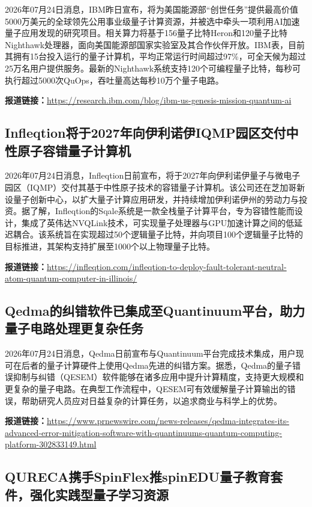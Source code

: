 \documentclass[12pt,a4paper]{ctexart}
\begin{document}
2026年07月24日消息，IBM昨日宣布，将为美国能源部“创世任务”提供最高价值5000万美元的全球领先公用事业级量子计算资源，并被选中牵头一项利用AI加速量子应用发现的研究项目。相关算力将基于156量子比特Heron和120量子比特Nighthawk处理器，面向美国能源部国家实验室及其合作伙伴开放。IBM表，目前其拥有15台投入运行的量子计算机，平均正常运行时间超过97\%，可全天候为超过25万名用户提供服务。最新的Nighthawk系统支持120个可编程量子比特，每秒可执行超过5000次QuOps，吞吐量高达每秒10万个量子电路。

\noindent\textbf{报道链接：}\url{https://research.ibm.com/blog/ibm-us-genesis-mission-quantum-ai}

\subsection{ Infleqtion将于2027年向伊利诺伊IQMP园区交付中性原子容错量子计算机 }

2026年07月24日消息，Infleqtion日前宣布，将于2027年向伊利诺伊量子与微电子园区（IQMP）交付其基于中性原子技术的容错量子计算机。该公司还在芝加哥新设量子创新中心，以扩大量子计算应用研发，并持续增加伊利诺伊州的劳动力与投资。据了解，Infleqtion的Sqale系统是一款全栈量子计算平台，专为容错性能而设计，集成了英伟达NVQLink技术，可实现量子处理器与GPU加速计算之间的低延迟耦合。该系统旨在实现超过50个逻辑量子比特，并向项目100个逻辑量子比特的目标推进，其架构支持扩展至1000个以上物理量子比特。

\noindent\textbf{报道链接：}\url{https://infleqtion.com/infleqtion-to-deploy-fault-tolerant-neutral-atom-quantum-computer-in-illinois/}

\subsection{ Qedma的纠错软件已集成至Quantinuum平台，助力量子电路处理更复杂任务 }

2026年07月24日消息，Qedma日前宣布与Quantinuum平台完成技术集成，用户现可在后者的量子计算硬件上使用Qedma先进的纠错方案。据悉，Qedma的量子错误抑制与纠错（QESEM）软件能够在诸多应用中提升计算精度，支持更大规模和更复杂的量子电路。在典型工作流程中，QESEM可有效缓解量子计算输出的错误，帮助研究人员应对日益复杂的计算任务，以追求商业与科学上的优势。

\noindent\textbf{报道链接：}\url{https://www.prnewswire.com/news-releases/qedma-integrates-its-advanced-error-mitigation-software-with-quantinuums-quantum-computing-platform-302833149.html}

\subsection{ QURECA携手SpinFlex推spinEDU量子教育套件，强化实践型量子学习资源 }
\end{document}
